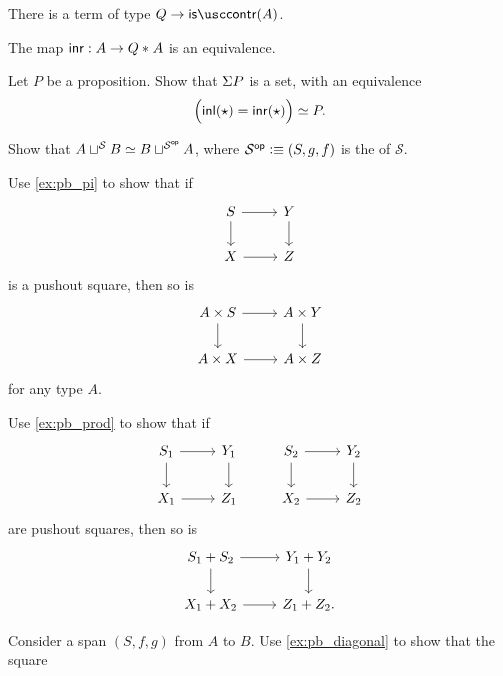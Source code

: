 \begin{exercises}
\begin{subexenum}
\item There is a term of type $Q\to\iscontr(A)$.
\item The map ${\mathsf{inr}}:A\to {Q}\ast_{}{A}$ is an equivalence.
\end{subexenum}
\item Let $P$ be a proposition. Show that $\Sigma P$ is a set, with an equivalence
\begin{equation*}
\eqv{\Big(\inl(\ttt)=\inr(\ttt)\Big)}{P}.
\end{equation*}
\item Show that $\eqv{A\sqcup^{\mathcal{S}} B}{B\sqcup^{\mathcal{S}^{\mathsf{op}}} A}$, where $\mathcal{S^{\mathsf{op}}}\vcentcolon\equiv (S,g,f)$ is the  of $\mathcal{S}$. 
\item Use \cref{ex:pb_pi} to show that if
\begin{equation*}
\begin{tikzcd}
S \arrow[r] \arrow[d] & Y \arrow[d] \\
X \arrow[r] & Z
\end{tikzcd}
\end{equation*}
is a pushout square, then so is
\begin{equation*}
\begin{tikzcd}
A\times S \arrow[r] \arrow[d] & A\times Y \arrow[d] \\
A\times X \arrow[r] & A\times Z
\end{tikzcd}
\end{equation*}
for any type $A$.
\item Use \cref{ex:pb_prod} to show that if
\begin{equation*}
\begin{tikzcd}
S_1 \arrow[r] \arrow[d] & Y_1 \arrow[d] & S_2 \arrow[r] \arrow[d] & Y_2 \arrow[d] \\
X_1 \arrow[r] & Z_1 & X_2 \arrow[r] & Z_2
\end{tikzcd}
\end{equation*}
are pushout squares, then so is
\begin{equation*}
\begin{tikzcd}
S_1+S_2 \arrow[r] \arrow[d] & Y_1+ Y_2 \arrow[d] \\
X_1 +X_2 \arrow[r] & Z_1+Z_2. 
\end{tikzcd}
\end{equation*}
\item 
\begin{subexenum}
\item Consider a span $(S,f,g)$ from $A$ to $B$. Use \cref{ex:pb_diagonal} to show that the square

\end{subexenum}
\end{exercises}

